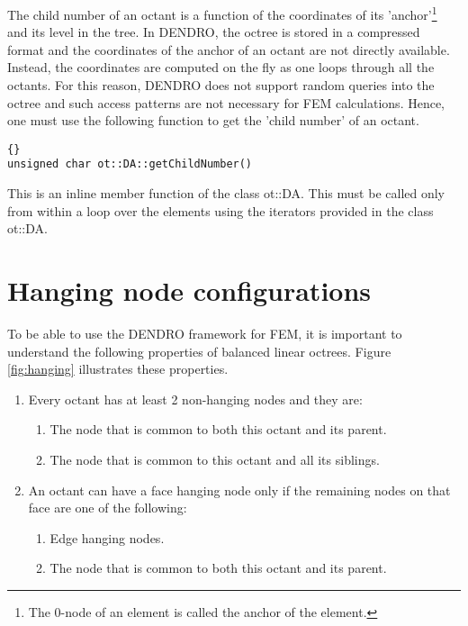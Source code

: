 \documentclass[12pt,reqno,a4paper]{report}
\numberwithin{equation}{section}
\begin{document}
The child number of an octant is a function of the coordinates of its 'anchor'\footnote{The 0-node of an element is called the anchor of the element.} and its level in the tree. In DENDRO, the octree is stored in a compressed format and the coordinates of the anchor of an octant are not directly available. Instead, the coordinates are computed on the fly as one loops through all the octants. For this reason, DENDRO does not support random queries into the octree and such access patterns are not necessary for FEM calculations. Hence, one must use the following function to get the 'child number' of an octant.

\begin{lstlisting}[frame=trbl, fontadjust]{}
unsigned char ot::DA::getChildNumber()
\end{lstlisting}

This is an inline member function of the class ot::DA. This must be called only from within a loop over the elements using the iterators 
 provided in the class ot::DA.
 
\section{Hanging node configurations}
\label{sec:hangingTypes}
To be able to use the DENDRO framework for FEM, it is important to understand the following properties of balanced linear octrees. Figure \ref{fig:hanging} illustrates these properties.
\begin{enumerate}
\item Every octant has at least 2 non-hanging nodes and they are:
\begin{enumerate}
\item The node that is common to both this octant and its parent.
\item The node that is common to this octant and all its siblings.
\end{enumerate}
\item An octant can have a face hanging node only if the remaining nodes on that face are one of the following:
\begin{enumerate}
\item Edge hanging nodes.
\item The node that is common to both this octant and its parent.
\end{enumerate}
\end{enumerate}
\end{document}
